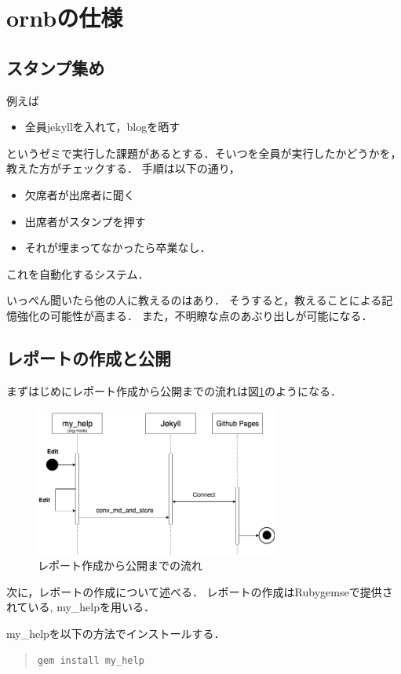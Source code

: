 \documentclass{hissymp}
\begin{document}
\section{ornbの仕様}
\label{sec:org7220395}
\subsection{スタンプ集め}
\label{sec:org63e8492}
例えば
\begin{itemize}
\item 全員jekyllを入れて，blogを晒す
\end{itemize}
というゼミで実行した課題があるとする．そいつを全員が実行したかどうかを，教えた方がチェックする．
手順は以下の通り，
\begin{itemize}
\item 欠席者が出席者に聞く
\item 出席者がスタンプを押す
\item それが埋まってなかったら卒業なし．
\end{itemize}
これを自動化するシステム．

いっぺん聞いたら他の人に教えるのはあり．
そうすると，教えることによる記憶強化の可能性が高まる．
また，不明瞭な点のあぶり出しが可能になる．

\subsection{レポートの作成と公開}
\label{sec:org782498e}
まずはじめにレポート作成から公開までの流れは図\ref{fig:org563b34f}のようになる．
\begin{figure}[htbp]
\centering
\includegraphics[width=8cm]{./images/myhelp_to_jekyll.png}
\caption{\label{fig:org563b34f}
レポート作成から公開までの流れ}
\end{figure}


次に，レポートの作成について述べる．
レポートの作成はRubygemseで提供されている,
my\_helpを用いる．

my\_helpを以下の方法でインストールする．
\begin{quote}
\begin{verbatim}
gem install my_help
\end{verbatim}
\end{quote}
\end{document}

